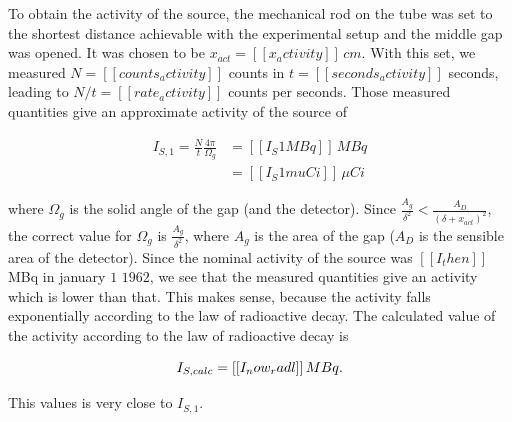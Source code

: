 \documentclass[a4paper]{article}
\begin{document}
To obtain the activity of the source, the mechanical rod on the tube was set to the shortest distance achievable with the experimental setup and the middle gap was opened. It was chosen to be $x_{act} = [[x_activity]] \, cm$. With this set, we measured $N = [[counts_activity]]$ counts in $t = [[seconds_activity]]$ seconds, leading to $N/t = [[rate_activity]]$ counts per seconds.
\newline
Those measured quantities give an approximate activity of the source of

\begin{align}
I_{S,1} = \frac{N}{t} \frac{4 \pi}{\Omega_{g}} &= [[I_S1MBq]]\, MBq \label{eq:activity1} \\
&= [[I_S1muCi]] \, \mu Ci
\end{align}

where $\Omega_g$ is the solid angle of the gap (and the detector). Since $\frac{A_g}{\delta^2} < \frac{A_D}{\left( \delta + x_{act}\right)^2}$, the correct value for $\Omega_g$ is $\frac{A_g}{\delta^2}$, where $A_g$ is the area of the gap ($A_D$ is the sensible area of the detector). Since the nominal activity of the source was $[[I_then]]$ MBq in january $1$ $1962$, we see that the measured quantities give an activity which is lower than that. This makes sense, because the activity falls exponentially according to the law of radioactive decay. The calculated value of the activity according to the law of radioactive decay is

\begin{equation}
I_{S,calc} = [[I_now_radl]]\, MBq. \label{eq:activity:calc} \\
\end{equation}

This values is very close to $I_{S,1}$.
\end{document}
